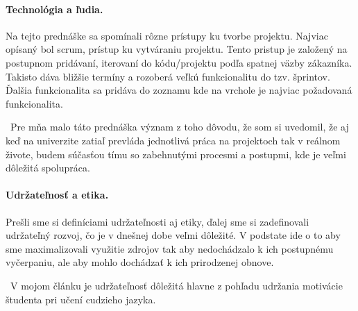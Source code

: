 \documentclass[10pt,slovak,a4paper]{article}
\begin{document}

\paragraph{Technológia a ľudia.}

Na tejto prednáške sa spomínali rôzne prístupy ku tvorbe projektu. Najviac opísaný bol scrum, prístup ku vytváraniu projektu. Tento pristup je založený na postupnom pridávaní, iterovaní do kódu/projektu podľa spatnej väzby zákazníka. Takisto dáva bližšie termíny a rozoberá veľkú funkcionalitu do tzv. šprintov. Ďalšia funkcionalita sa pridáva do zoznamu kde na vrchole je najviac požadovaná funkcionalita.
\par
\indent~Pre mňa malo táto prednáška význam z toho dôvodu, že som si uvedomil, že aj keď na univerzite zatiaľ prevláda jednotlivá práca na projektoch tak v reálnom živote, budem súčasťou tímu so zabehnutými procesmi a postupmi, kde je veľmi dôležitá spolupráca.


\paragraph{Udržateľnosť a etika.}

Prešli sme si definíciami udržateľnosti aj etiky, ďalej sme si zadefinovali udržateľný rozvoj, čo je v dnešnej dobe veľmi dôležité. V podstate ide o to aby sme maximalizovali využitie zdrojov tak aby nedochádzalo k ich postupnému vyčerpaniu, ale aby mohlo dochádzať k ich prirodzenej obnove.
\par
\indent~V mojom článku je udržateľnosť dôležitá hlavne z pohľadu udržania motivácie študenta pri učení cudzieho jazyka.

\end{document}
